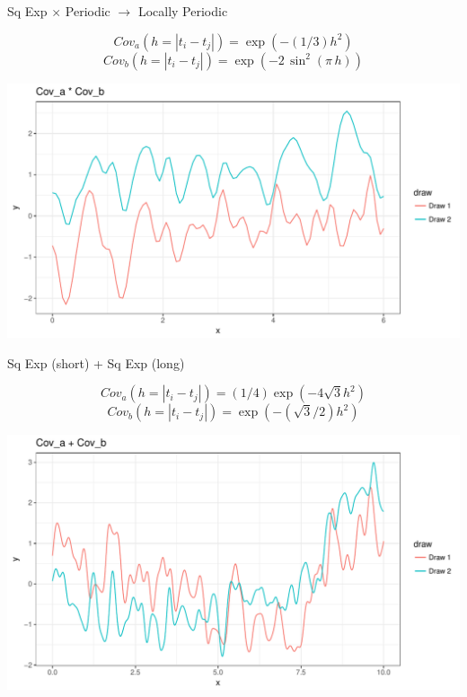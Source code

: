 \documentclass[11pt,ignorenonframetext,]{beamer}
\begin{document}
\begin{frame}[t]{Sq Exp \(\times\) Periodic \(\to\) Locally Periodic}

\vspace{-5mm} \[ Cov_a(h = |t_i - t_j|) =\exp(-(1/3)h^2) \]
\[ Cov_b(h = |t_i - t_j|) = \exp\left(-2\, \sin^2\left(\pi\,h\right)\right) \]

\begin{center}\includegraphics{Lec14_files/figure-beamer/unnamed-chunk-19-1} \end{center}

\end{frame}

\begin{frame}[t]{Sq Exp (short) + Sq Exp (long)}

\vspace{-5mm} \[ Cov_a(h = |t_i - t_j|) = (1/4) \exp(-4\sqrt{3}h^2) \]
\[ Cov_b(h = |t_i - t_j|) = \exp(-(\sqrt{3}/2)h^2) \]

\begin{center}\includegraphics{Lec14_files/figure-beamer/unnamed-chunk-20-1} \end{center}

\end{frame}
\end{document}
